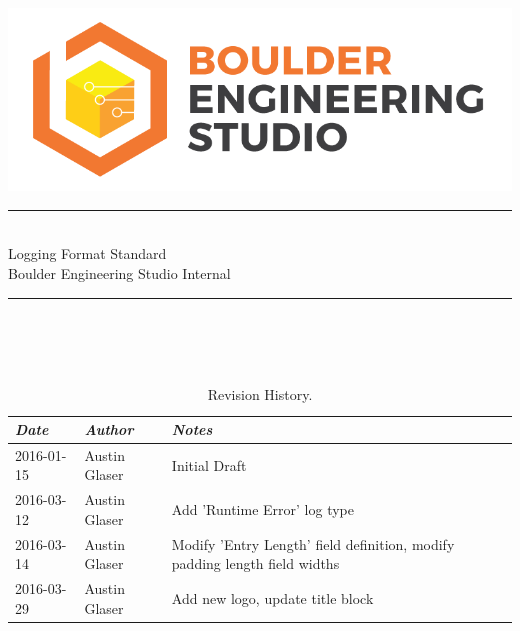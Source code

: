 \documentclass[paper=letter, fontsize=10pt]{scrartcl} %
\numberwithin{equation}{section} %
\numberwithin{figure}{section} %
\numberwithin{table}{section} %
\begin{document}
\renewcommand{\arraystretch}{1.5}

\newcommand{\hreffoot}[2]{\href{#1}{#2}\footnote{#1}}
\newcommand{\horrule}[1]{\rule{\linewidth}{#1}} %
\normalfont \normalsize 
{\hfill
\includegraphics[scale=0.1]{images/bexigon_light.png} \\[1pt] %
}
\horrule{0.5pt} \\[.2cm] %
{\centering 
	\sc \LARGE Logging Format Standard \\
    \sc Boulder Engineering Studio Internal\\
}
\horrule{0.5pt} \\[0.1cm] %
\\ [5pt]
\\  [5pt]

\begin{table}[ht!]
    \begin{center}
        \begin{tabularx}{\textwidth}{|l|l|X|}
            \hline
            \emph{Date} & \emph{Author} & \emph{Notes}                                                               \\ \hline
            2016-01-15  & Austin Glaser & Initial Draft                                                              \\ \hline
            2016-03-12  & Austin Glaser & Add 'Runtime Error' log type                                               \\ \hline
            2016-03-14  & Austin Glaser & Modify 'Entry Length' field definition, modify padding length field widths \\ \hline
            2016-03-29  & Austin Glaser & Add new logo, update title block                                           \\ \hline
        \end{tabularx}
        \caption{Revision History.}
        \label{tab:revision}
    \end{center}
\end{table}
\end{document}
